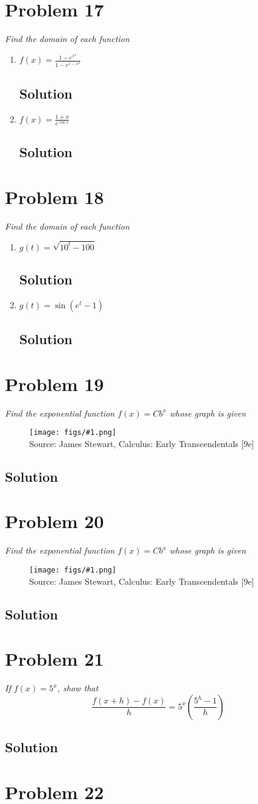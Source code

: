 \documentclass[11pt]{article}
\newcommand{\soln}{\subsection*}
\newcommand{\qn}{\textit}
\newcommand{\imagesource}[1]{{\footnotesize Source: #1}}
\newcommand{\imgqn}[1]{
	\begin{figure}[H]
		\centering
		\texttt{[image: figs/\#1.png]}\\
		\imagesource{James Stewart, Calculus: Early Transcendentals [9e]}
	\end{figure}
}
\begin{document}
\section*{Problem 17}

\qn{Find the domain of each function}

\begin{enumerate}
	\item \qn{$f(x)=\frac{1-e^{x^2}}{1-e^{1-x^2}}$}
	\soln{Solution}
	
	\item \qn{$f(x)=\frac{1+x}{e^{\cos{x}}}$}
	\soln{Solution}
\end{enumerate}

\section*{Problem 18}

\qn{Find the domain of each function}

\begin{enumerate}
	\item \qn{$g(t)=\sqrt{10^t-100}$}
	\soln{Solution}
	
	\item \qn{$g(t)=\sin(e^t-1)$}
	\soln{Solution}
\end{enumerate}

\section*{Problem 19}

\qn{Find the exponential function $f(x)=Cb^x$ whose graph is given}
\imgqn{1.4.19}

\soln{Solution}

\section*{Problem 20}

\qn{Find the exponential function $f(x)=Cb^x$ whose graph is given}
\imgqn{1.4.20}

\soln{Solution}

\section*{Problem 21}

\qn{If $f(x)=5^x$, show that $$\frac{f(x+h)-f(x)}{h}=5^x(\frac{5^h-1}{h})$$}

\soln{Solution}

\section*{Problem 22}
\end{document}
